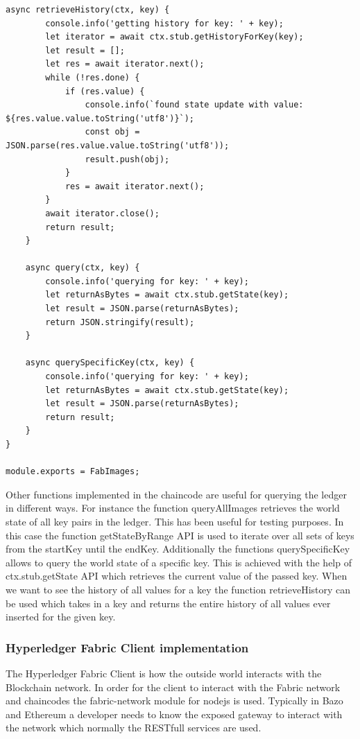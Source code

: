 \begin{lstlisting}[caption={Chaincode for interacting with the network.},label=chaincode, captionpos=b]
    async retrieveHistory(ctx, key) {
        console.info('getting history for key: ' + key);
        let iterator = await ctx.stub.getHistoryForKey(key);
        let result = [];
        let res = await iterator.next();
        while (!res.done) {
            if (res.value) {
                console.info(`found state update with value: ${res.value.value.toString('utf8')}`);
                const obj = JSON.parse(res.value.value.toString('utf8'));
                result.push(obj);
            }
            res = await iterator.next();
        }
        await iterator.close();
        return result;
    }

    async query(ctx, key) {
        console.info('querying for key: ' + key);
        let returnAsBytes = await ctx.stub.getState(key);
        let result = JSON.parse(returnAsBytes);
        return JSON.stringify(result);
    }

    async querySpecificKey(ctx, key) {
        console.info('querying for key: ' + key);
        let returnAsBytes = await ctx.stub.getState(key);
        let result = JSON.parse(returnAsBytes);
        return result;
    }
}

module.exports = FabImages;

\end{lstlisting}


Other functions implemented in the chaincode are useful for querying the ledger in different ways. For instance the function {\selectfont queryAllImages}  retrieves the world state of all key pairs in the ledger. This has been useful for testing purposes. In this case the function {\selectfont getStateByRange} API is used to iterate over all sets of keys from the startKey until the endKey. 
Additionally the functions {\selectfont querySpecificKey} allows to query the world state of a specific key. This is achieved with the help of {\selectfont ctx.stub.getState} API which retrieves the current value of the passed key. When we want to see the history of all values for a key the function {\selectfont retrieveHistory} can be used which takes in a key and returns the entire history of all values ever inserted for the given key. 

\subsubsection{Hyperledger Fabric Client implementation}
The Hyperledger Fabric Client is how the outside world interacts with the Blockchain network. In order for the client to interact with the Fabric network and chaincodes the {\selectfont fabric-network} module for nodejs is used. Typically in Bazo and Ethereum a developer needs to know the exposed gateway to interact with the network which normally the RESTfull services are used. 

